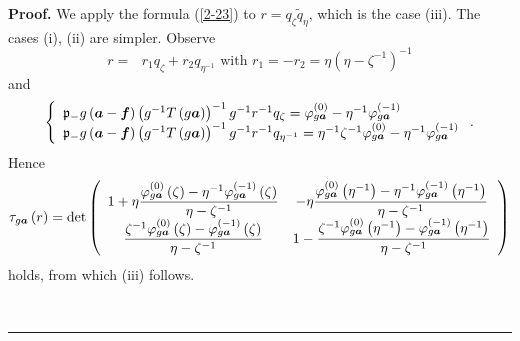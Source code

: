 \documentclass[a4paper]{article}%
\newenvironment{proof}[1][Proof]{\noindent\textbf{#1.} }{\ \rule{0.5em}{0.5em}}
\begin{document}
\begin{proof}
We apply the formula (\ref{2-23}) to $r=q_{\zeta}\widetilde{q}_{\eta}$, which
is the case (iii). The cases (i), (ii) are simpler. Observe%
\[
r=\text{\ }r_{1}q_{\zeta}+r_{2}q_{\eta^{-1}}\text{ with }r_{1}=-r_{2}%
=\eta\left(  \eta-\zeta^{-1}\right)  ^{-1}%
\]
and%
\[
\left\{
\begin{array}
[c]{l}%
\mathfrak{p}_{-}g\left(  \boldsymbol{a}-\boldsymbol{f}\right)  \left(
g^{-1}T\left(  g\boldsymbol{a}\right)  \right)  ^{-1}g^{-1}r^{-1}q_{\zeta
}=\varphi_{g\boldsymbol{a}}^{\left(  0\right)  }-\eta^{-1}\varphi
_{g\boldsymbol{a}}^{\left(  -1\right)  }\\
\mathfrak{p}_{-}g\left(  \boldsymbol{a}-\boldsymbol{f}\right)  \left(
g^{-1}T\left(  g\boldsymbol{a}\right)  \right)  ^{-1}g^{-1}r^{-1}q_{\eta^{-1}%
}=\eta^{-1}\zeta^{-1}\varphi_{g\boldsymbol{a}}^{\left(  0\right)  }-\eta
^{-1}\varphi_{g\boldsymbol{a}}^{\left(  -1\right)  }%
\end{array}
\right.  \text{.}%
\]
Hence%
\[
\tau_{g\boldsymbol{a}}\left(  r\right)  =\det\left(
\begin{array}
[c]{cc}%
1+\eta\dfrac{\varphi_{g\boldsymbol{a}}^{\left(  0\right)  }\left(
\zeta\right)  -\eta^{-1}\varphi_{g\boldsymbol{a}}^{\left(  -1\right)  }\left(
\zeta\right)  }{\eta-\zeta^{-1}} & -\eta\dfrac{\varphi_{g\boldsymbol{a}%
}^{\left(  0\right)  }\left(  \eta^{-1}\right)  -\eta^{-1}\varphi
_{g\boldsymbol{a}}^{\left(  -1\right)  }\left(  \eta^{-1}\right)  }{\eta
-\zeta^{-1}}\\
\dfrac{\zeta^{-1}\varphi_{g\boldsymbol{a}}^{\left(  0\right)  }\left(
\zeta\right)  -\varphi_{g\boldsymbol{a}}^{\left(  -1\right)  }\left(
\zeta\right)  }{\eta-\zeta^{-1}} & 1-\dfrac{\zeta^{-1}\varphi_{g\boldsymbol{a}%
}^{\left(  0\right)  }\left(  \eta^{-1}\right)  -\varphi_{g\boldsymbol{a}%
}^{\left(  -1\right)  }\left(  \eta^{-1}\right)  }{\eta-\zeta^{-1}}%
\end{array}
\right)
\]
holds, from which (iii) follows.


\end{proof}
\end{document}
